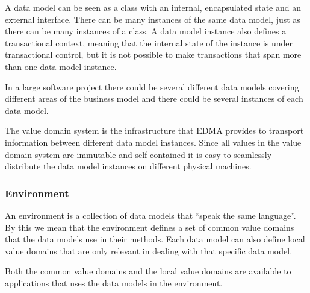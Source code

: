 A data model can be seen as a class with an internal, encapsulated
state and an external interface. There can be many instances of the
same data model, just as there can be many instances of a class. A
data model instance also defines a transactional context, meaning
that the internal state of the instance is under transactional control,
but it is not possible to make transactions that span more than one
data model instance.

In a large software project there could be several different data
models covering different areas of the business model and there could
be several instances of each data model. 

The value domain system is the infrastructure that EDMA provides to
transport information between different data model instances. Since
all values in the value domain system are immutable and self-contained
it is easy to seamlessly distribute the data model instances on different
physical machines.


\subsubsection{Environment}

An environment is a collection of data models that ``speak the same
language''. By this we mean that the environment defines a set of
common value domains that the data models use in their methods. Each
data model can also define local value domains that are only relevant
in dealing with that specific data model.

Both the common value domains and the local value domains are available
to applications that uses the data models in the environment.
